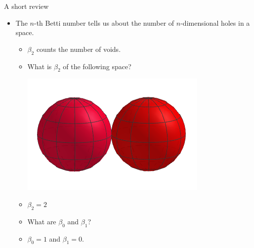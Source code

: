 \begin{frame}{A short review}
\begin{itemize}
\item The $n$-th Betti number tells us about the number of $n$-dimensional holes in a space.
	\begin{itemize}
	\item $\beta_2$ counts the number of voids.
	\item What is $\beta_2$ of the following space?
	\begin{center}
	\includegraphics[scale=0.5]{images/S2VS2}
	\end{center}
	\item<2-> $\beta_2 = 2$
	\item<2-> What are $\beta_0$ and $\beta_1$?
	\item<3-> $\beta_0 = 1$ and $\beta_1 = 0$.
	\end{itemize}
\end{itemize}
\end{frame}
